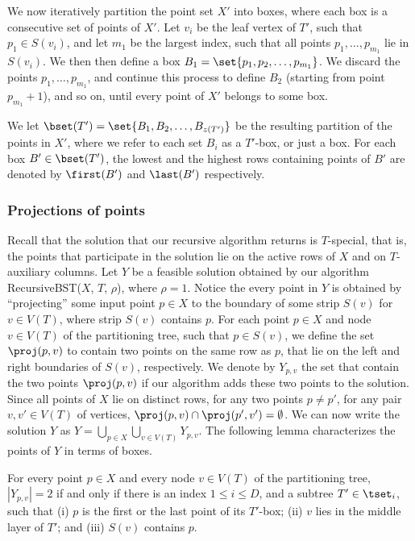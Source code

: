 \documentclass{toc}
\begin{document}
We now iteratively partition the point set $X'$ into boxes, where each box is a consecutive set of points of $X'$. 
Let $v_i$ be the leaf vertex of $T'$, such that $p_1\in S(v_i)$, and let $m_1$ be the largest index, such that all points $p_1,\ldots,p_{m_1}$ lie in $S(v_i)$. We then then define a box $B_1 = \set{p_1, p_2,\ldots, p_{m_1}}$. We discard the points $p_1,\ldots,p_{m_1}$, and continue this process to define $B_2$ (starting from point $p_{m_1}+1$), and so on, until every point of $X'$ belongs to some box.

%
%

We let $\bset(T') = \set{B_1,B_2,\ldots, B_{z(T')}}$ be the resulting partition of the points in $X'$, where we refer to each set $B_i$ as a $T'$-box, or just a box.
For each box $B' \in \bset(T')$, the lowest and the highest rows containing points of $B'$ are denoted by $\first(B')$ and $\last(B')$ respectively.
 


\subsubsection{Projections of points} 

Recall that the solution that our recursive algorithm returns is $T$-special, that is, the points that participate in the solution lie on the active rows of $X$ and on $T$-auxiliary columns. 
Let $Y$ be a feasible solution obtained by our algorithm {\sc RecursiveBST}($X$, $T$, $\rho$), where $\rho=1$. 
Notice the every point in $Y$ is obtained by ``projecting'' some input point $p \in X$ to the boundary of some strip $S(v)$ for $v \in V(T)$, where strip $S(v)$ contains $p$.  
For each point $p \in X$ and node $v \in V(T)$ of the partitioning tree, such that $p \in S(v)$, we define the set $\proj(p,v)$ to contain two points on the same row as $p$, that lie on the left and right boundaries of $S(v)$, respectively.
We denote by $Y_{p,v}$ the set that contain the two points $\proj(p,v)$ if  our algorithm adds these two points to the solution. Since all points of $X$ lie on distinct rows, for any two points $p\neq p'$, for any pair $v,v'\in V(T)$ of vertices, $\proj(p,v)\cap \proj(p',v')=\emptyset$.
We can now write the solution $Y$ as $Y = \bigcup_{p \in X} \bigcup_{v \in V(T)} Y_{p,v}$.   
%
%
%
The following lemma characterizes the points of $Y$ in terms of boxes.  

\begin{lemma} 
For every point $p \in X$ and every node $v \in V(T)$ of the partitioning tree, $|Y_{p,v}| =2$ if and only if there is an index $1\leq i\leq D$, and a subtree $T' \in \tset_i$, such that (i) $p$ is the first or the last point of its $T'$-box; (ii) $v$ lies in the middle layer of $T'$; and (iii) $S(v)$ contains $p$.
\end{lemma} 
\end{document}
